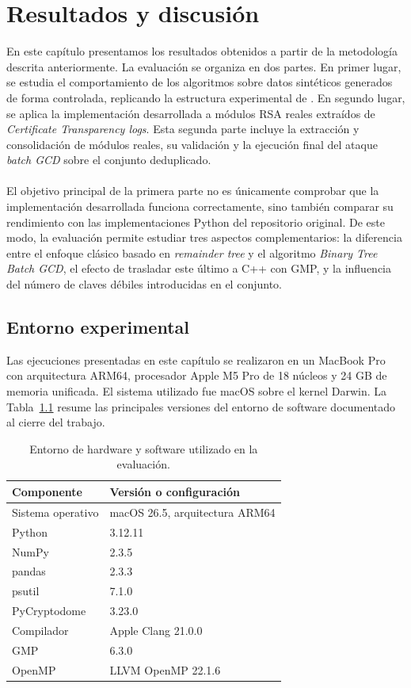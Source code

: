 \chapter{Resultados y discusión}

En este capítulo presentamos los resultados obtenidos a partir de la metodología descrita anteriormente. La evaluación se organiza en dos partes. En primer lugar, se estudia el comportamiento de los algoritmos sobre datos sintéticos generados de forma controlada, replicando la estructura experimental de \citet{pelofske2024efficient}. En segundo lugar, se aplica la implementación desarrollada a módulos RSA reales extraídos de \textit{Certificate Transparency logs}. Esta segunda parte incluye la extracción y consolidación de módulos reales, su validación y la ejecución final del ataque \textit{batch GCD} sobre el conjunto deduplicado.
\\
\\
El objetivo principal de la primera parte no es únicamente comprobar que la implementación desarrollada funciona correctamente, sino también comparar su rendimiento con las implementaciones Python del repositorio original. De este modo, la evaluación permite estudiar tres aspectos complementarios: la diferencia entre el enfoque clásico basado en \textit{remainder tree} y el algoritmo \textit{Binary Tree Batch GCD}, el efecto de trasladar este último a C++ con GMP, y la influencia del número de claves débiles introducidas en el conjunto.

\section{Entorno experimental}

Las ejecuciones presentadas en este capítulo se realizaron en un MacBook Pro con
arquitectura ARM64, procesador Apple M5 Pro de 18 núcleos y 24 GB de memoria
unificada. El sistema utilizado fue macOS sobre el kernel Darwin. La Tabla~\ref{tab:entorno_experimental} resume las principales versiones del
entorno de software documentado al cierre del trabajo.

\begin{table}[htbp]
    \centering
    \small
    \begin{tabular}{|l|l|}
        \hline
        Componente & Versión o configuración \\
        \hline
        Sistema operativo & macOS 26.5, arquitectura ARM64 \\
        Python & 3.12.11 \\
        NumPy & 2.3.5 \\
        pandas & 2.3.3 \\
        psutil & 7.1.0 \\
        PyCryptodome & 3.23.0 \\
        Compilador & Apple Clang 21.0.0 \\
        GMP & 6.3.0 \\
        OpenMP & LLVM OpenMP 22.1.6 \\
        \hline
    \end{tabular}
    \caption{Entorno de hardware y software utilizado en la evaluación.}
    \label{tab:entorno_experimental}
\end{table}

